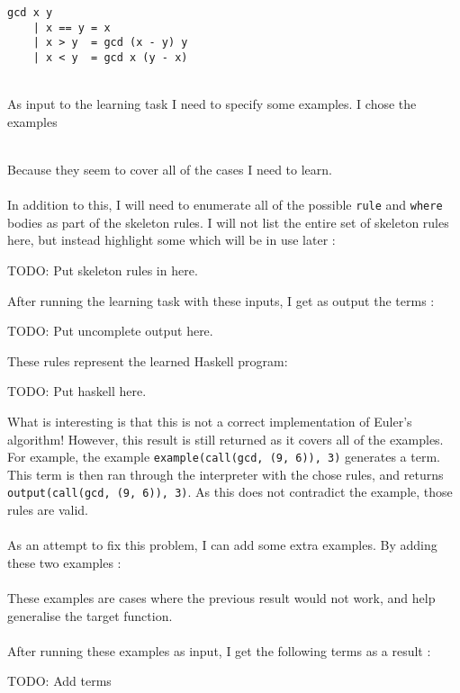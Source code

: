 \begin{lstlisting}
gcd x y
	| x == y = x
	| x > y	 = gcd (x - y) y
	| x < y	 = gcd x (y - x)
\end{lstlisting}
\mbox{}\\
As input to the learning task I need to specify some examples. I chose the examples 


\mbox{}\\
Because they seem to cover all of the cases I need to learn. \\ \\
In addition to this, I will need to enumerate all of the possible \lstinline{rule} and \lstinline{where} bodies as part of the skeleton rules. I will not list the entire set of skeleton rules here, but instead highlight some which will be in use later : 

TODO: Put skeleton rules in here.

After running the learning task with these inputs, I get as output the terms :

TODO: Put uncomplete output here.

These rules represent the learned Haskell program:

TODO: Put haskell here.

What is interesting is that this is not a correct implementation of Euler's algorithm! However, this result is still returned as it covers all of the examples. For example, the example \lstinline{example(call(gcd, (9, 6)), 3)} generates a  term. This term is then ran through the interpreter with the chose rules, and returns \lstinline{output(call(gcd, (9, 6)), 3)}. As this does not contradict the example, those rules are valid. \\ \\%
As an attempt to fix this problem, I can add some extra examples. By adding these two examples :\\


\mbox{}\\
These examples are cases where the previous result would not work, and help generalise the target function. \\ \\
After running these examples as input, I get the following terms as a result :

TODO: Add terms

